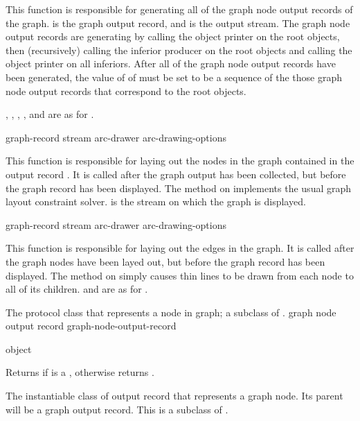 This function is responsible for generating all of the graph node output records
of the graph.   is the graph output record, and 
is the output stream.  The graph node output records are generating by calling
the object printer on the root objects, then (recursively) calling the inferior
producer on the root objects and calling the object printer on all inferiors.
After all of the graph node output records have been generated, the value of
 of  must be set to be a sequence of the
those graph node output records that correspond to the root objects.

, , ,
, and  are as for
.

 {graph-record stream arc-drawer arc-drawing-options} 

This function is responsible for laying out the nodes in the graph contained in
the output record .  It is called after the graph output has
been collected, but before the graph record has been displayed.  The method on
 implements the usual graph layout constraint
solver.   is the stream on which the graph is displayed.

 {graph-record stream arc-drawer arc-drawing-options}

This function is responsible for laying out the edges in the graph.  It is
called after the graph nodes have been layed out, but before the graph record
has been displayed.  The method on  simply
causes thin lines to be drawn from each node to all of its children.
 and  are as for .



The protocol class that represents a node in graph; a subclass of
.
 {graph node output record} {graph-node-output-record}

 {object}

Returns  if  is a ,
otherwise returns .


The instantiable class of output record that represents a graph node.  Its
parent will be a graph output record.  This is a subclass of
.

